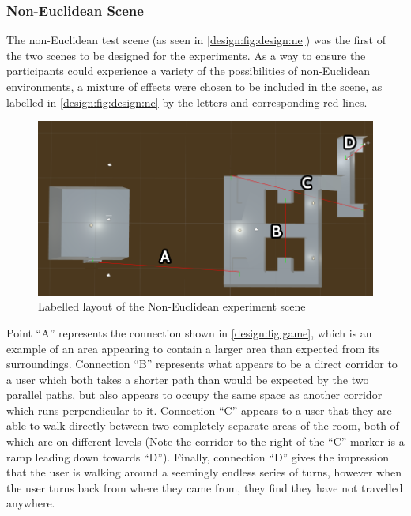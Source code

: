 		\subsubsection{Non-Euclidean Scene}

			The non-Euclidean test scene (as seen in \autoref{design:fig:design:ne}) was the first of the two scenes to be designed for the experiments.
			As a way to ensure the participants could experience a variety of the possibilities of non-Euclidean environments, a mixture of effects were chosen to be included in the scene, as labelled in \autoref{design:fig:design:ne} by the letters and corresponding red lines.

			\begin{figure}[h]
				\includegraphics[width=1\textwidth]{Images/NE_Layout}
				\centering
				\caption{Labelled layout of the Non-Euclidean experiment scene}
				\label{design:fig:design:ne}
			\end{figure}

			Point \enquote{A} represents the connection shown in \autoref{design:fig:game}, which is an example of an area appearing to contain a larger area than expected from its surroundings.
			Connection \enquote{B} represents what appears to be a direct corridor to a user which both takes a shorter path than would be expected by the two parallel paths, but also appears to occupy the same space as another corridor which runs perpendicular to it.
			Connection \enquote{C} appears to a user that they are able to walk directly between two completely separate areas of the room, both of which are on different levels (Note the corridor to the right of the \enquote{C} marker is a ramp leading down towards \enquote{D}).
			Finally, connection \enquote{D} gives the impression that the user is walking around a seemingly endless series of turns, however when the user turns back from where they came from, they find they have not travelled anywhere.

